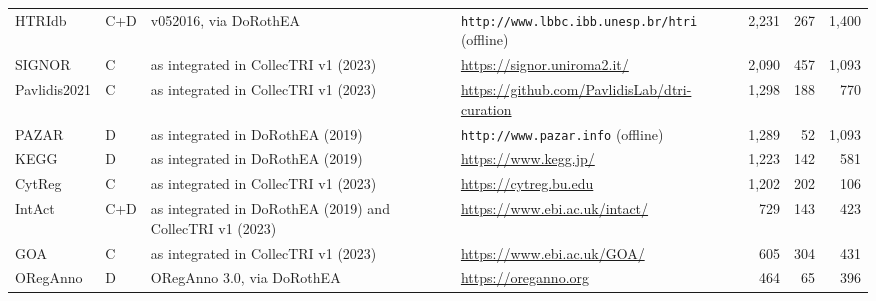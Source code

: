 \begin{table}[htbp]
\begin{tabular}{@{}llp{2.8cm}p{2.3cm}p{3.1cm}rrr@{}}
HTRIdb & C+D & \parbox[t]{2.8cm}{\raggedright\scriptsize v052016, via DoRothEA} & \parbox[t]{2.3cm}{\raggedright\scriptsize \citet{bovolenta2012htridb}} & \parbox[t]{3.1cm}{\raggedright\scriptsize \nolinkurl{http://www.lbbc.ibb.unesp.br/htri} (offline)} & 2{,}231 & 267 & 1{,}400 \\
SIGNOR & C & \parbox[t]{2.8cm}{\raggedright\scriptsize as integrated in CollecTRI v1 (2023)} & \parbox[t]{2.3cm}{\raggedright\scriptsize \citet{perfetto2016signor}} & \parbox[t]{3.1cm}{\raggedright\scriptsize \url{https://signor.uniroma2.it/}} & 2{,}090 & 457 & 1{,}093 \\
Pavlidis2021 & C & \parbox[t]{2.8cm}{\raggedright\scriptsize as integrated in CollecTRI v1 (2023)} & \parbox[t]{2.3cm}{\raggedright\scriptsize \citet{chu2021curation}} & \parbox[t]{3.1cm}{\raggedright\scriptsize \url{https://github.com/PavlidisLab/dtri-curation}} & 1{,}298 & 188 & 770 \\
PAZAR & D & \parbox[t]{2.8cm}{\raggedright\scriptsize as integrated in DoRothEA (2019)} & \parbox[t]{2.3cm}{\raggedright\scriptsize \citet{portales2009pazar}} & \parbox[t]{3.1cm}{\raggedright\scriptsize \nolinkurl{http://www.pazar.info} (offline)} & 1{,}289 & 52 & 1{,}093 \\
KEGG & D & \parbox[t]{2.8cm}{\raggedright\scriptsize as integrated in DoRothEA (2019)} & \parbox[t]{2.3cm}{\raggedright\scriptsize \citet{kanehisa2012kegg}} & \parbox[t]{3.1cm}{\raggedright\scriptsize \url{https://www.kegg.jp/}} & 1{,}223 & 142 & 581 \\
CytReg & C & \parbox[t]{2.8cm}{\raggedright\scriptsize as integrated in CollecTRI v1 (2023)} & \parbox[t]{2.3cm}{\raggedright\scriptsize \citet{carrascopro2018cytreg}} & \parbox[t]{3.1cm}{\raggedright\scriptsize \url{https://cytreg.bu.edu}} & 1{,}202 & 202 & 106 \\
IntAct & C+D & \parbox[t]{2.8cm}{\raggedright\scriptsize as integrated in DoRothEA (2019) and CollecTRI v1 (2023)} & \parbox[t]{2.3cm}{\raggedright\scriptsize \citet{orchard2014intact}} & \parbox[t]{3.1cm}{\raggedright\scriptsize \url{https://www.ebi.ac.uk/intact/}} & 729 & 143 & 423 \\
GOA & C & \parbox[t]{2.8cm}{\raggedright\scriptsize as integrated in CollecTRI v1 (2023)} & \parbox[t]{2.3cm}{\raggedright\scriptsize \citet{huntley2015goa}} & \parbox[t]{3.1cm}{\raggedright\scriptsize \url{https://www.ebi.ac.uk/GOA/}} & 605 & 304 & 431 \\
ORegAnno & D & \parbox[t]{2.8cm}{\raggedright\scriptsize ORegAnno 3.0, via DoRothEA} & \parbox[t]{2.3cm}{\raggedright\scriptsize \citet{lesurf2016oreganno}} & \parbox[t]{3.1cm}{\raggedright\scriptsize \url{https://oreganno.org}} & 464 & 65 & 396 \\

\end{tabular}
\end{table}
